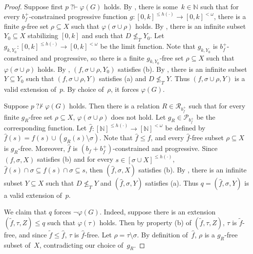 \documentclass{article}
\def\P{\mathcal{P}}
\newcommand{\qvdash}{\operatorname{{?}{\vdash}}}
\newcommand{\nqvdash}{\operatorname{{?}{\nvdash}}}
\newcommand{\NN}[0]{\mathbb{N}}
\newcommand{\R}{\mathcal{R}}
\begin{document}
\begin{proof}
Suppose first $p \qvdash \varphi(G)$ holds. By , there is some~$k \in \NN$ such that for every $b_f^{+}$-constrained progressive function $g : [0, k]^{\leq h(\cdot)} \to [0, k]^{<\omega}$, there is a finite $g$-free set $\rho \subseteq X$ such that $\varphi(\sigma \cup \rho)$ holds. By , there is an infinite subset $Y_0 \subseteq X$ stabilizing $[0, k]$ and such that $D \not \leq_T Y_0$. Let $g_{k,Y_0} : [0, k]^{\leq h(\cdot)} \to [0, k]^{<\omega}$ be the limit function. Note that $g_{k,Y_0}$ is $b_f^{+}$-constrained and progressive, so there is a finite $g_{k,Y_0}$-free set $\rho \subseteq X$ such that $\varphi(\sigma \cup \rho)$ holds.
By , $(f, \sigma \cup \rho, Y_0)$ satisfies (b).
By , there is an infinite subset $Y \subseteq Y_0$ such that $(f, \sigma \cup \rho, Y)$ satisfies (a) and $D \not \leq_T Y$. Thus $(f, \sigma \cup \rho, Y)$ is a valid extension of~$p$. By choice of~$\rho$, it forces $\varphi(G)$.

Suppose $p \nqvdash \varphi(G)$ holds. Then there is a relation $R \in \R_{b_f^{+}}$ such that for every finite $g_R$-free set $\rho \subseteq X$, $\varphi(\sigma \cup \rho)$ does not hold. Let $g_R \in \P_{b_f^{+}}$ be the corresponding function. Let $\hat{f} : [\NN]^{\leq h(\cdot)} \to [\NN]^{<\omega}$ be defined by $\hat{f}(s) = f(s) \cup (g_R(s) \setminus \sigma)$. Note that $\hat{f} \leq f$, and every $\hat{f}$-free subset $\rho \subseteq X$ is $g_R$-free. Moreover, $\hat{f}$ is $(b_f + b_f^{+})$-constrained and progressive. Since $(f, \sigma, X)$ satisfies (b) and for every $s \in [\sigma \cup X]^{\leq h(\cdot)}$, $\hat{f}(s)\cap \sigma\subseteq f(s)\cap \sigma\subseteq s$, then $(\hat{f}, \sigma, X)$ satisfies (b). By , there is an infinite subset $Y \subseteq X$ such that $D \not \leq_T Y$ and $(\hat{f}, \sigma, Y)$ satisfies (a). Thus $q = (\hat{f}, \sigma, Y)$ is a valid extension of~$p$. 

We claim that $q$ forces $\neg \varphi(G)$. Indeed, suppose there is an extension $(\tilde{f}, \tau, Z) \leq q$ such that $\varphi(\tau)$ holds. Then by property (b) of  $(\tilde{f}, \tau, Z)$, $\tau$ is $\tilde{f}$-free, and since $\tilde{f} \leq \hat{f}$, $\tau$ is $\hat{f}$-free. Let $\rho = \tau \setminus \sigma$. By definition of~$\hat{f}$, $\rho$ is a $g_R$-free subset of~$X$, contradicting our choice of~$g_R$.
\end{proof}
\end{document}
